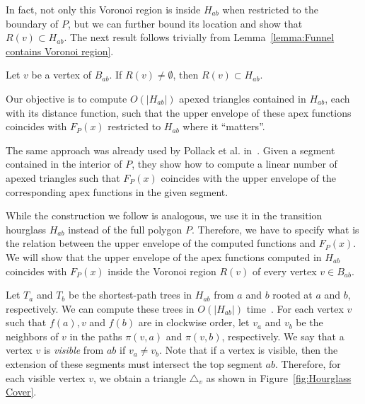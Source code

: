 \documentclass[a4paper,UKenglish]{lipics}
\newcommand{\F}[2]{\ensuremath{F_{\scriptscriptstyle #1}(#2)}}
\newcommand{\fn}[2]{\ensuremath{S_{\scriptscriptstyle #1}(#2)}}
\newcommand{\ff}[1]{\ensuremath{f(#1)}}
\newcommand{\p}[2]{\ensuremath{\pi(#1, #2)}}
\begin{document}
In fact, not only this Voronoi region is inside $H_{ab}$ when restricted to the boundary of $P$, but we can further bound its location and show that $R(v)\subset H_{ab}$. 
 The next result follows trivially from Lemma~\ref{lemma:Funnel contains Voronoi region}.

\begin{corollary}\label{lemma:Cell contained in geodesic triangle}
Let $v$ be a vertex of $B_{ab}$. If $R(v)\neq \emptyset$, then $R(v) \subset H_{ab}$.
\end{corollary}


Our objective is to compute $O(|H_{ab}|)$ apexed triangles contained in $H_{ab}$, each with its distance function, such that the upper envelope of these apex functions coincides with $\F{P}{x}$ restricted to $H_{ab}$ where it ``matters''.

The same approach was already used by Pollack et al. in~\cite[Section 3]{pollackComputingCenter}. 
Given a segment contained in the interior of $P$, they show 
how to compute a linear number of apexed triangles such that $\F{P}{x}$ coincides with the upper envelope of the corresponding apex functions in the given segment.

While the construction we follow is analogous, we use it in the transition hourglass $H_{ab}$ instead of the full polygon $P$. 
Therefore, we have to specify what is the relation between the upper envelope of the computed functions and $\F{P}{x}$. 
We will show that the upper envelope of the apex functions computed in $H_{ab}$ coincides with $\F{P}{x}$ inside the Voronoi region $R(v)$ of every vertex $v\in B_{ab}$.

Let $T_a$ and $T_b$ be the shortest-path trees in $H_{ab}$ from $a$ and $b$ rooted at $a$ and $b$, respectively. 
We can compute these trees in $O(|H_{ab}|)$ time~\cite{guibasShortestPathTree}. 
For each vertex $v$ such that  $\ff{a}, v$ and $\ff{b}$ are in clockwise order, let $v_a$ and $v_b$ be the neighbors of $v$ in the paths $\p{v}{a}$ and $\p{v}{ b}$, respectively.
We say that a vertex $v$ is \emph{visible} from $ab$ if $v_a\neq v_b$.
Note that if a vertex is visible, then the extension of these segments must intersect the top segment $ab$. 
Therefore, for each visible vertex $v$, we obtain a triangle $\triangle_v$ as shown in Figure~\ref{fig:Hourglass Cover}.
\end{document}
